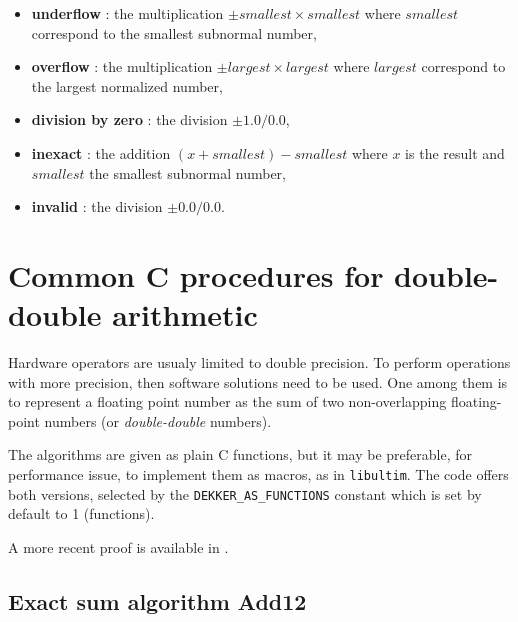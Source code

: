 \begin{itemize}
\item {\bf underflow} : the multiplication $\pm smallest \times smallest$ where $smallest$ correspond to the smallest subnormal number,
\item {\bf overflow} : the multiplication  $\pm largest \times largest$ where $largest$ correspond to the largest normalized number,
\item {\bf division by zero} : the division $\pm 1.0/0.0$,
\item {\bf inexact} : the addition $(x + smallest) - smallest$ where $x$ is the result and  $smallest$ the smallest subnormal number,
\item {\bf invalid} : the division $\pm 0.0/0.0$.
\end{itemize}








\section{Common C procedures for double-double arithmetic\label{section:commonCdoubledouble}}
Hardware operators are usualy limited to double precision. To perform
operations with more precision, then software solutions need to be
used. One among them is to represent a floating point number as the
sum of two non-overlapping floating-point numbers (or
\emph{double-double} numbers). 

The algorithms are given as plain C functions, but it may be
preferable, for performance issue, to implement them as macros, as in
\texttt{libultim}.  The code offers both versions,
selected by the \texttt{DEKKER\_AS\_FUNCTIONS} constant which is set
by default to 1 (functions).

A more recent proof is available in \cite{Lauter2005LIP:tripledouble}.

\subsection{Exact sum algorithm {Add12}}

